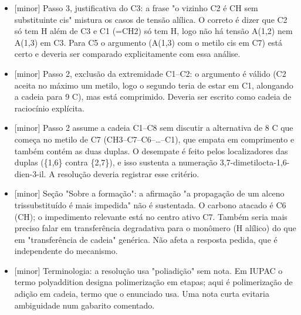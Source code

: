 \documentclass{article}%
\begin{document}
\begin{itemize}%
\item%
{[}minor{]} Passo 3, justificativa do C3: a frase "o vizinho C2 é CH sem substituinte cis" mistura os casos de tensão alílica. O correto é dizer que C2 só tem H além de C3 e C1 (=CH2) só tem H, logo não há tensão A(1,2) nem A(1,3) em C3. Para C5 o argumento (A(1,3) com o metilo cis em C7) está certo e deveria ser comparado explicitamente com essa análise.%
\item%
{[}minor{]} Passo 2, exclusão da extremidade C1--C2: o argumento é válido (C2 aceita no máximo um metilo, logo o segundo teria de estar em C1, alongando a cadeia para 9 C), mas está comprimido. Deveria ser escrito como cadeia de raciocínio explícita.%
\item%
{[}minor{]} Passo 2 assume a cadeia C1--C8 sem discutir a alternativa de 8 C que começa no metilo de C7 (CH3--C7--C6--\ldots{}--C1), que empata em comprimento e também contém as duas duplas. O desempate é feito pelos localizadores das duplas (\{1,6\} contra \{2,7\}), e isso sustenta a numeração 3,7{-}dimetilocta{-}1,6{-}dien{-}3{-}il. A resolução deveria registrar esse critério.%
\item%
{[}minor{]} Seção "Sobre a formação": a afirmação "a propagação de um alceno trissubstituído é mais impedida" não é sustentada. O carbono atacado é C6 (CH); o impedimento relevante está no centro ativo C7. Também seria mais preciso falar em transferência degradativa para o monômero (H alílico) do que em "transferência de cadeia" genérica. Não afeta a resposta pedida, que é independente do mecanismo.%
\item%
{[}minor{]} Terminologia: a resolução usa "poliadição" sem nota. Em IUPAC o termo polyaddition designa polimerização em etapas; aqui é polimerização de adição em cadeia, termo que o enunciado usa. Uma nota curta evitaria ambiguidade num gabarito comentado.%
\end{itemize}%
\end{document}
